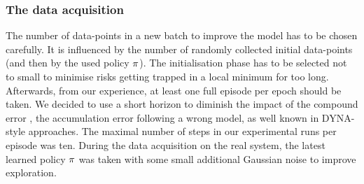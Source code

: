 \documentclass[
reprint,
amsmath,amssymb,amsfonts,clevref,
aps,
prstab,
]{revtex4-2}
\newcommand{\tocheck}[1]{\textcolor{blue}{#1}}
\begin{document}
	\subsubsection{The data acquisition}
	The number of data-points in a new batch to improve the model has to be chosen carefully. It is influenced by the number of randomly collected initial data-points (and then by the used policy $\pi$). The initialisation phase has to be selected not to small to minimise risks getting trapped in a local minimum for too long. Afterwards, from our experience, at least one full episode per epoch should be taken. We decided to use a short horizon to diminish the impact of the compound error \cite{Janner2019}, the accumulation error following a wrong model, as well known in DYNA-style approaches. The maximal number of steps in our experimental runs per episode was ten. During the data acquisition on the real system, the latest learned policy $\pi$ was taken with some small additional Gaussian noise to improve exploration.
\end{document}
